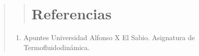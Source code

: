 \documentclass[11pt, a4paper]{article}
\begin{document}
\begin{quote}
\begin{center}
\begin{adjustwidth}{-1.7cm}{-1cm}
\begin{quote}
{\section{Referencias}\label{referencias}}
\end{quote}
\vspace*{0.5cm} %


\begin{enumerate}
    \item Apuntes Universidad Alfonso X El Sabio. Asignatura de Termofluidodinámica. 
\end{enumerate}





\end{adjustwidth}
\end{center}
\end{quote}
\end{document}
